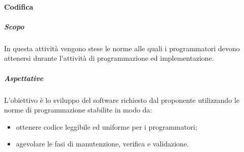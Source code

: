 			\paragraph{Codifica}
				\subparagraph{Scopo}	
					In questa attività vengono stese le norme alle quali i programmatori devono attenersi durante l’attività di programmazione ed implementazione.
				\subparagraph{Aspettative}
					 L’obiettivo è lo sviluppo del software richiesto dal proponente utilizzando le norme di programmazione stabilite in modo da:
					 	\begin{itemize}
					 	\item ottenere codice leggibile ed uniforme per i programmatori;
					 	\item agevolare le fasi di manutenzione, verifica e validazione.
					 \end{itemize} 
%					
%				 
